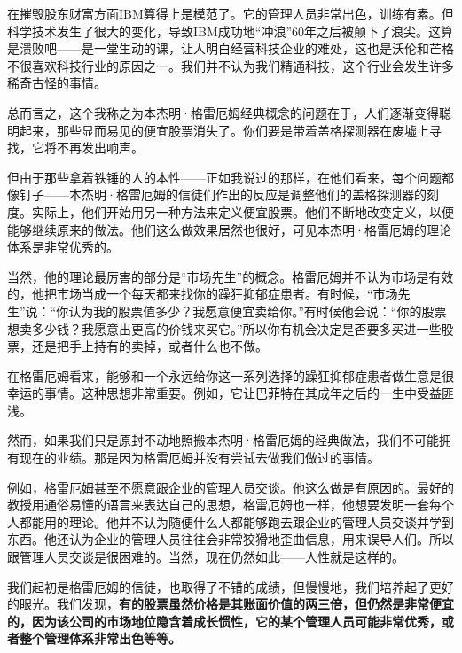在摧毁股东财富方面IBM算得上是模范了。它的管理人员非常出色，训练有素。但科学技术发生了很大的变化，导致IBM成功地“冲浪”60年之后被颠下了浪尖。这算是溃败吧——是一堂生动的课，让人明白经营科技企业的难处，这也是沃伦和芒格不很喜欢科技行业的原因之一。我们并不认为我们精通科技，这个行业会发生许多稀奇古怪的事情。
\par

总而言之，这个我称之为本杰明·格雷厄姆经典概念的问题在于，人们逐渐变得聪明起来，那些显而易见的便宜股票消失了。你们要是带着盖格探测器在废墟上寻找，它将不再发出响声。
\par

但由于那些拿着铁锤的人的本性——正如我说过的那样，在他们看来，每个问题都像钉子——本杰明·格雷厄姆的信徒们作出的反应是调整他们的盖格探测器的刻度。实际上，他们开始用另一种方法来定义便宜股票。他们不断地改变定义，以便能够继续原来的做法。他们这么做效果居然也很好，可见本杰明·格雷厄姆的理论体系是非常优秀的。
\par

当然，他的理论最厉害的部分是“市场先生”的概念。格雷厄姆并不认为市场是有效的，他把市场当成一个每天都来找你的躁狂抑郁症患者。有时候，“市场先生”说：“你认为我的股票值多少？我愿意便宜卖给你。”有时候他会说：“你的股票想卖多少钱？我愿意出更高的价钱来买它。”所以你有机会决定是否要多买进一些股票，还是把手上持有的卖掉，或者什么也不做。
\par

在格雷厄姆看来，能够和一个永远给你这一系列选择的躁狂抑郁症患者做生意是很幸运的事情。这种思想非常重要。例如，它让巴菲特在其成年之后的一生中受益匪浅。
\par

然而，如果我们只是原封不动地照搬本杰明·格雷厄姆的经典做法，我们不可能拥有现在的业绩。那是因为格雷厄姆并没有尝试去做我们做过的事情。
\par

例如，格雷厄姆甚至不愿意跟企业的管理人员交谈。他这么做是有原因的。最好的教授用通俗易懂的语言来表达自己的思想，格雷厄姆也一样，他想要发明一套每个人都能用的理论。他并不认为随便什么人都能够跑去跟企业的管理人员交谈并学到东西。他还认为企业的管理人员往往会非常狡猾地歪曲信息，用来误导人们。所以跟管理人员交谈是很困难的。当然，现在仍然如此——人性就是这样的。
\par

我们起初是格雷厄姆的信徒，也取得了不错的成绩，但慢慢地，我们培养起了更好的眼光。我们发现，\textbf{有的股票虽然价格是其账面价值的两三倍，但仍然是非常便宜的，因为该公司的市场地位隐含着成长惯性，它的某个管理人员可能非常优秀，或者整个管理体系非常出色等等。}
\par

